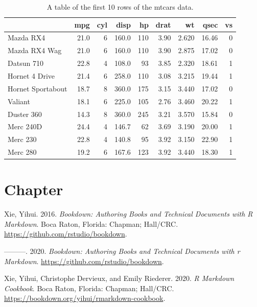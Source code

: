 \documentclass[AutoFakeBold,AutoFakeSlant,scheme=plain,degree=bachelor,zihao=-4]{sustechthesis}
\newlength{\cslhangindent}
\newlength{\cslentryspacingunit} %
\newenvironment{CSLReferences}[2] %
 {%
  \setlength{\parindent}{0pt}
  \ifodd #1
  \let\oldpar\par
  \def\par{\hangindent=\cslhangindent\oldpar}
  \fi
  \setlength{\parskip}{#2\cslentryspacingunit}
 }%
 {}
\theoremstyle{definition}
\theoremstyle{definition}
\theoremstyle{definition}
\theoremstyle{definition}
\theoremstyle{remark}
\begin{document}
\begin{table}

\caption{\label{tab:tab1}A table of the first 10 rows of the mtcars data.}
\centering
\begin{tabular}[t]{lrrrrrrrr}
\toprule
  & mpg & cyl & disp & hp & drat & wt & qsec & vs\\
\midrule
Mazda RX4 & 21.0 & 6 & 160.0 & 110 & 3.90 & 2.620 & 16.46 & 0\\
Mazda RX4 Wag & 21.0 & 6 & 160.0 & 110 & 3.90 & 2.875 & 17.02 & 0\\
Datsun 710 & 22.8 & 4 & 108.0 & 93 & 3.85 & 2.320 & 18.61 & 1\\
Hornet 4 Drive & 21.4 & 6 & 258.0 & 110 & 3.08 & 3.215 & 19.44 & 1\\
Hornet Sportabout & 18.7 & 8 & 360.0 & 175 & 3.15 & 3.440 & 17.02 & 0\\
\addlinespace
Valiant & 18.1 & 6 & 225.0 & 105 & 2.76 & 3.460 & 20.22 & 1\\
Duster 360 & 14.3 & 8 & 360.0 & 245 & 3.21 & 3.570 & 15.84 & 0\\
Merc 240D & 24.4 & 4 & 146.7 & 62 & 3.69 & 3.190 & 20.00 & 1\\
Merc 230 & 22.8 & 4 & 140.8 & 95 & 3.92 & 3.150 & 22.90 & 1\\
Merc 280 & 19.2 & 6 & 167.6 & 123 & 3.92 & 3.440 & 18.30 & 1\\
\bottomrule
\end{tabular}
\end{table}

\hypertarget{chapter}{%
\section{Chapter}\label{chapter}}

\lipsum[1]

\clearpage
{}

\hypertarget{refs}{}
\begin{CSLReferences}{1}{0}
\leavevmode{}%
Xie, Yihui. 2016. \emph{Bookdown: Authoring Books and Technical Documents with {R} Markdown}. Boca Raton, Florida: Chapman; Hall/CRC. \url{https://github.com/rstudio/bookdown}.

\leavevmode{}%
---------. 2020. \emph{Bookdown: Authoring Books and Technical Documents with r Markdown}. \url{https://github.com/rstudio/bookdown}.

\leavevmode{}%
Xie, Yihui, Christophe Dervieux, and Emily Riederer. 2020. \emph{R Markdown Cookbook}. Boca Raton, Florida: Chapman; Hall/CRC. \url{https://bookdown.org/yihui/rmarkdown-cookbook}.

\end{CSLReferences}
\end{document}
